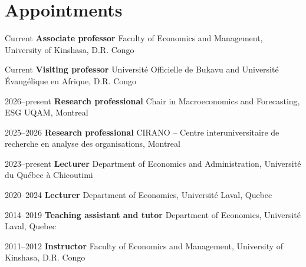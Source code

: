 \documentclass[11pt,letterpaper]{article}
\newenvironment{datelist}
  {\begin{description}[style=multiline,leftmargin=2.75cm,labelwidth=2.55cm,
     labelsep=0.2cm,font=\normalfont\small\color{soft},
     itemsep=0.45em,topsep=0.25em,parsep=0.15em]}
  {\end{description}}
\newcommand{\dotsep}{\;\textcolor{soft}{\textbullet}\;}
\begin{document}
\section{Appointments}
\begin{datelist}
  \item[Current] \textbf{Associate professor} \dotsep Faculty of Economics and Management, University of Kinshasa, D.R. Congo
  \item[Current] \textbf{Visiting professor} \dotsep Université Officielle de Bukavu and Université Évangélique en Afrique, D.R. Congo
  \item[2026--present] \textbf{Research professional} \dotsep Chair in Macroeconomics and Forecasting, ESG UQAM, Montreal
  \item[2025--2026] \textbf{Research professional} \dotsep CIRANO -- Centre interuniversitaire de recherche en analyse des organisations, Montreal
  \item[2023--present] \textbf{Lecturer} \dotsep Department of Economics and Administration, Université du Québec à Chicoutimi
  \item[2020--2024] \textbf{Lecturer} \dotsep Department of Economics, Université Laval, Quebec
  \item[2014--2019] \textbf{Teaching assistant and tutor} \dotsep Department of Economics, Université Laval, Quebec
  \item[2011--2012] \textbf{Instructor} \dotsep Faculty of Economics and Management, University of Kinshasa, D.R. Congo
\end{datelist}
\end{document}
